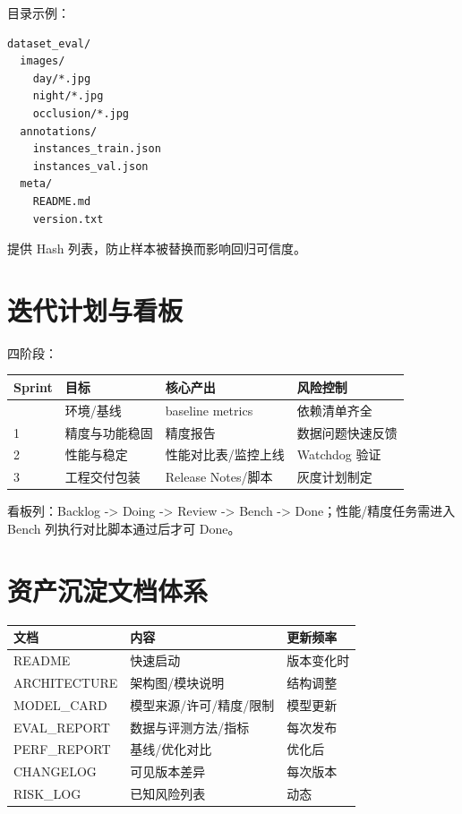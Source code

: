 目录示例：

\begin{lstlisting}
dataset_eval/
  images/
    day/*.jpg
    night/*.jpg
    occlusion/*.jpg
  annotations/
    instances_train.json
    instances_val.json
  meta/
    README.md
    version.txt
\end{lstlisting}

提供 Hash 列表，防止样本被替换而影响回归可信度。

\section{迭代计划与看板}\label{src-book-chapter10-h6}

四阶段：

\begin{longtable}[]{@{}llll@{}}
\toprule\noalign{}
Sprint & 目标 & 核心产出 & 风险控制 \\
\midrule\noalign{}
\endhead
\bottomrule\noalign{}
\endlastfoot
0 & 环境/基线 & baseline metrics & 依赖清单齐全 \\
1 & 精度与功能稳固 & 精度报告 & 数据问题快速反馈 \\
2 & 性能与稳定 & 性能对比表/监控上线 & Watchdog 验证 \\
3 & 工程交付包装 & Release Notes/脚本 & 灰度计划制定 \\
\end{longtable}

看板列：Backlog -\textgreater{} Doing -\textgreater{} Review
-\textgreater{} Bench -\textgreater{} Done；性能/精度任务需进入 Bench
列执行对比脚本通过后才可 Done。

\section{资产沉淀文档体系}\label{src-book-chapter10-h7}

\begin{longtable}[]{@{}lll@{}}
\toprule\noalign{}
文档 & 内容 & 更新频率 \\
\midrule\noalign{}
\endhead
\bottomrule\noalign{}
\endlastfoot
README & 快速启动 & 版本变化时 \\
ARCHITECTURE & 架构图/模块说明 & 结构调整 \\
MODEL\_CARD & 模型来源/许可/精度/限制 & 模型更新 \\
EVAL\_REPORT & 数据与评测方法/指标 & 每次发布 \\
PERF\_REPORT & 基线/优化对比 & 优化后 \\
CHANGELOG & 可见版本差异 & 每次版本 \\
RISK\_LOG & 已知风险列表 & 动态 \\
\end{longtable}

